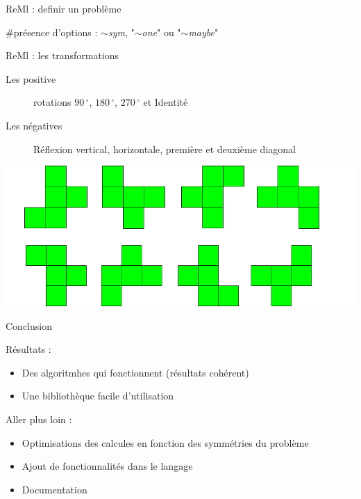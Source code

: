 \documentclass{beamer}
\begin{document}
\begin{frame}{ReMl : definir un problème}



\#présence d'options :  
\emph{$\sim$sym}, "\emph{$\sim$one}" ou "\emph{$\sim$maybe}"
 
 \end{frame}


\begin{frame}{ReMl : les transformations}
 
\begin{description}
\item[Les positive] rotations $90\,^{\circ}$, $180\,^{\circ}$, 
$270\,^{\circ}$ et Identité
\item[Les négatives] Réflexion vertical, horizontale, première et 
deuxième diagonal
\end{description}
\includegraphics[scale=0.5]{../imports/transformations.pdf}
\end{frame}




\begin{frame}{Conclusion}

Résultats :  
\begin{itemize}
\item Des algoritmhes qui fonctionnent (résultats cohérent)
\item Une bibliothèque facile d'utilisation
\end{itemize}

 Aller plus loin : 
\begin{itemize}
\item Optimisations des calcules en fonction des symmétries du problème
\item Ajout de fonctionnalités dans le langage
\item Documentation
\end{itemize}



\end{frame}
\end{document}
